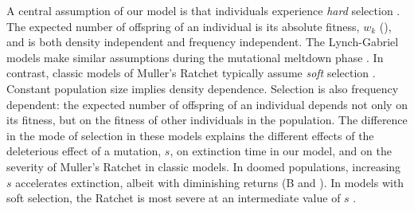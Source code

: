 \documentclass[9pt,lineno]{elife}
\begin{document}
A central assumption of our model  is that individuals experience \textit{hard} selection \citep{wal75}.   
The expected number of offspring of an individual is its absolute fitness, $w_k$ (), and is both density independent and frequency independent.  The Lynch-Gabriel models make similar assumptions during the mutational meltdown phase \citep{lyn93,lyn95}. 
% 
In contrast, classic models of Muller's Ratchet typically assume \textit{soft} selection \citep{wal75}.  Constant population size implies density dependence.  Selection is also frequency dependent: the expected number of offspring of an individual depends not only on its fitness, but on the fitness of other individuals in the population.
%
The difference in the mode of selection in these models explains the different effects of the deleterious effect of a mutation, $s$, on extinction time in our model, and on the severity of Muller's Ratchet in classic models.  In doomed populations, increasing $s$ accelerates extinction, albeit with diminishing returns (B and ).  In models with soft selection, the Ratchet is most severe at an intermediate value of $s$ 
\citep[C;][]{lyn95, Gordo_On_2000, gor00b}.  







\end{document}
